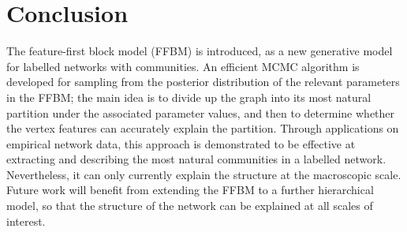 \section{Conclusion}
\label{sec:conclusion}

The feature-first block model
(FFBM) is introduced, as a 
new generative model for labelled 
networks with communities.
An efficient MCMC algorithm  
is developed for sampling 
from the posterior distribution of
the relevant parameters in the FFBM;
the main idea is to divide up the graph into 
its most natural partition under the associated
parameter values, and then to determine whether 
the vertex features can accurately explain the partition. 
Through applications on empirical
network data, this approach 
is demonstrated to be effective at extracting and describing 
the most natural communities in a labelled network. 
Nevertheless, it
can only currently explain the structure at the macroscopic
scale. Future work will benefit from extending 
the FFBM to a further hierarchical model,
so that
the structure of the network 
can be explained at all scales of interest.



